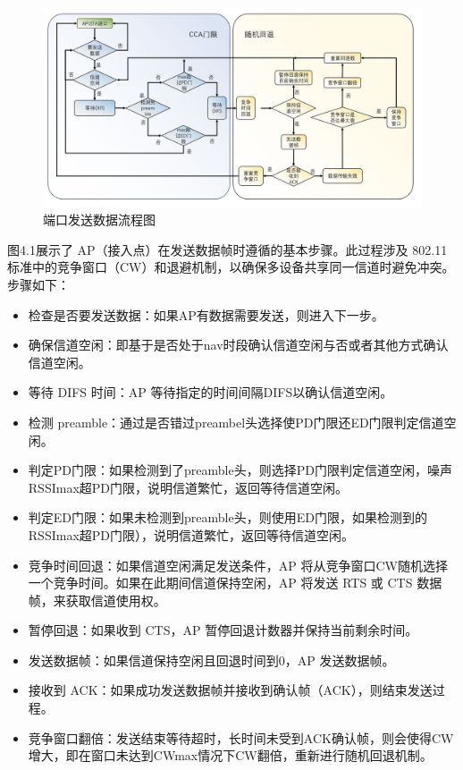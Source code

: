\documentclass[bwprint]{gmcmthesis}
\begin{document}
\begin{figure}[H]
	\centering
	\includegraphics[width=0.9\linewidth]{figures/4.1}
	\caption{端口发送数据流程图}
	\label{fig:端口发送数据流程图}
\end{figure}

图4.1展示了 AP（接入点）在发送数据帧时遵循的基本步骤。此过程涉及 802.11 标准中的竞争窗口（CW）和退避机制，以确保多设备共享同一信道时避免冲突。步骤如下：

\begin{itemize}
	\item 检查是否要发送数据：如果AP有数据需要发送，则进入下一步。
	\item 确保信道空闲：即基于是否处于nav时段确认信道空闲与否或者其他方式确认信道空闲。
	\item 等待 DIFS 时间：AP 等待指定的时间间隔DIFS以确认信道空闲。
	\item 检测 preamble：通过是否错过preambel头选择使PD门限还ED门限判定信道空闲。
	\item 判定PD门限：如果检测到了preamble头，则选择PD门限判定信道空闲，噪声RSSImax超PD门限，说明信道繁忙，返回等待信道空闲。
	\item 判定ED门限：如果未检测到preamble头，则使用ED门限，如果检测到的RSSImax超PD门限），说明信道繁忙，返回等待信道空闲。
	\item 竞争时间回退：如果信道空闲满足发送条件，AP 将从竞争窗口CW随机选择一个竞争时间。如果在此期间信道保持空闲，AP 将发送 RTS 或 CTS 数据帧，来获取信道使用权。
	\item 暂停回退：如果收到 CTS，AP 暂停回退计数器并保持当前剩余时间。
	\item 发送数据帧：如果信道保持空闲且回退时间到0，AP 发送数据帧。
	\item 接收到 ACK：如果成功发送数据帧并接收到确认帧（ACK），则结束发送过程。
	\item 竞争窗口翻倍：发送结束等待超时，长时间未受到ACK确认帧，则会使得CW增大，即在窗口未达到CWmax情况下CW翻倍，重新进行随机回退机制。
\end{itemize}
\end{document}
